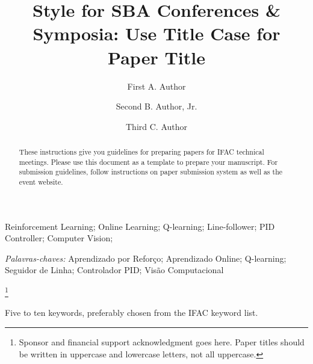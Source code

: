 \documentclass[a4paper]{ifacconf}
\begin{document}
\begin{frontmatter}
\begin{abstract}
\end{abstract}



\begin{keyword}
Reinforcement Learning; Online Learning; Q-learning; Line-follower; PID Controller; Computer Vision;

\vskip 1mm%
{\noindent\it Palavras-chaves:} Aprendizado por Reforço; Aprendizado Online; Q-learning; Seguidor de Linha; Controlador PID; Visão Computacional
\end{keyword}




\end{frontmatter}
\else
% 

\begin{frontmatter}

\title{Style for SBA Conferences \& Symposia: Use Title Case for
  Paper Title} 

\thanks[footnoteinfo]{Sponsor and financial support acknowledgment
goes here. Paper titles should be written in uppercase and lowercase
letters, not all uppercase.}

\author[First]{First A. Author} 
\author[Second]{Second B. Author, Jr.} 
\author[Third]{Third C. Author}


\address[First]{Faculdade de Engenharia Elétrica, Universidade do Triângulo, MG, (e-mail: autor1@faceg@univt.br).}
\address[Second]{Faculdade de Engenharia de Controle \& Automação, Universidade do Futuro, RJ (e-mail: autor2@feca.unifutu.rj)}
\address[Third]{Electrical Engineering Department, 
   Seoul National University, Seoul, Korea, (e-mail: author3@snu.ac.kr)}
   
\renewcommand{\abstractname}{{\bf Abstract:~}}   
   
\begin{abstract}                %
These instructions give you guidelines for preparing papers for IFAC
technical meetings. Please use this document as a template to prepare
your manuscript. For submission guidelines, follow instructions on
paper submission system as well as the event website.
\end{abstract}

\begin{keyword}
Five to ten keywords, preferably chosen from the IFAC keyword list.
\end{keyword}

\end{frontmatter}
\fi
\end{document}
